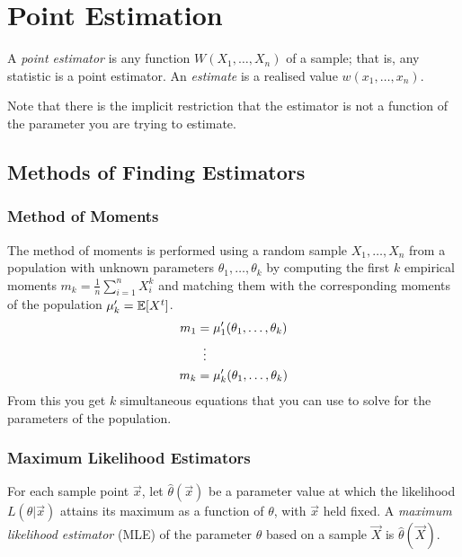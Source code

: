 \section{Point Estimation}

\begin{definition}
    A \emph{point estimator} is any function $W(X_1, \dots, X_n)$ of a sample; that is, any statistic is a point estimator. An \emph{estimate} is a realised value $w(x_1, \dots, x_n)$.
\end{definition}

Note that there is the implicit restriction that the estimator is not a function of the parameter you are trying to estimate.

\subsection{Methods of Finding Estimators}


\subsubsection{Method of Moments}
The method of moments is performed using a random sample $X_1, \dots, X_n$ from a population with unknown parameters $\theta_1, \dots, \theta_k$ by computing the first $k$ empirical moments $m_k = \frac{1}{n}\sum_{i=1}^nX_i^k$ and matching them with the corresponding moments of the population $\mu_k' = \mathbb{E}{}[X^t]$. 
\begin{align*}
    m_1 &= \mu_1'(\theta_1, \dots, \theta_k)\\
        &\vdotswithin{=} \\
    m_k &= \mu_k' (\theta_1, \dots, \theta_k)
\end{align*}   
From this you get $k$ simultaneous equations that you can use to solve for the parameters of the population.


\subsubsection{Maximum Likelihood Estimators}
\begin{definition}
    For each sample point $\vec{x}$, let $\hat{\theta}(\vec{x})$ be a parameter value at which the likelihood $L(\theta \vert{} \vec{x})$ attains its maximum as a function of $\theta$, with $\vec{x}$ held fixed. A \emph{maximum likelihood estimator} (MLE) of the parameter $\theta$ based on a sample $\vec{X}$ is $\hat{\theta}(\vec{X})$.
\end{definition}

